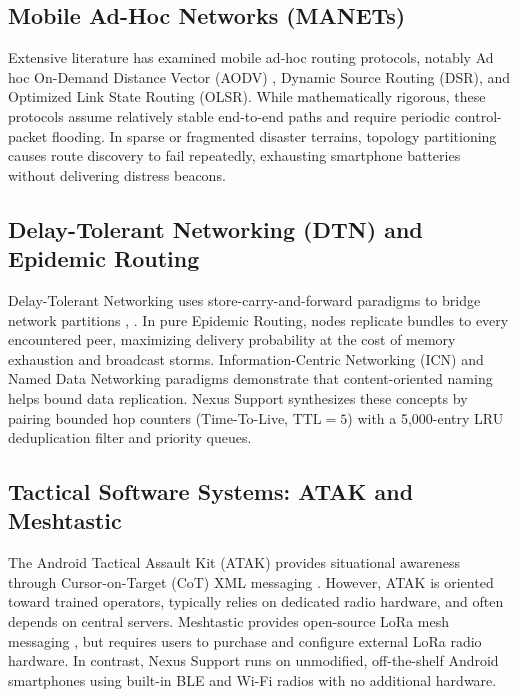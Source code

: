 \documentclass[conference,a4paper]{IEEEtran}
\begin{document}
\subsection{Mobile Ad-Hoc Networks (MANETs)}
Extensive literature has examined mobile ad-hoc routing protocols, notably Ad hoc On-Demand Distance Vector (AODV) \cite{2}, Dynamic Source Routing (DSR), and Optimized Link State Routing (OLSR). While mathematically rigorous, these protocols assume relatively stable end-to-end paths and require periodic control-packet flooding. In sparse or fragmented disaster terrains, topology partitioning causes route discovery to fail repeatedly, exhausting smartphone batteries without delivering distress beacons.

\subsection{Delay-Tolerant Networking (DTN) and Epidemic Routing}
Delay-Tolerant Networking uses store-carry-and-forward paradigms to bridge network partitions \cite{3}, \cite{17}. In pure Epidemic Routing, nodes replicate bundles to every encountered peer, maximizing delivery probability at the cost of memory exhaustion and broadcast storms. Information-Centric Networking (ICN) and Named Data Networking paradigms \cite{13} demonstrate that content-oriented naming helps bound data replication. Nexus Support synthesizes these concepts by pairing bounded hop counters (Time-To-Live, $\text{TTL} = 5$) with a 5,000-entry LRU deduplication filter and priority queues.

\subsection{Tactical Software Systems: ATAK and Meshtastic}
The Android Tactical Assault Kit (ATAK) provides situational awareness through Cursor-on-Target (CoT) XML messaging \cite{14}. However, ATAK is oriented toward trained operators, typically relies on dedicated radio hardware, and often depends on central servers. Meshtastic provides open-source LoRa mesh messaging \cite{15}, but requires users to purchase and configure external LoRa radio hardware. In contrast, Nexus Support runs on unmodified, off-the-shelf Android smartphones using built-in BLE and Wi-Fi radios with no additional hardware.
\end{document}

